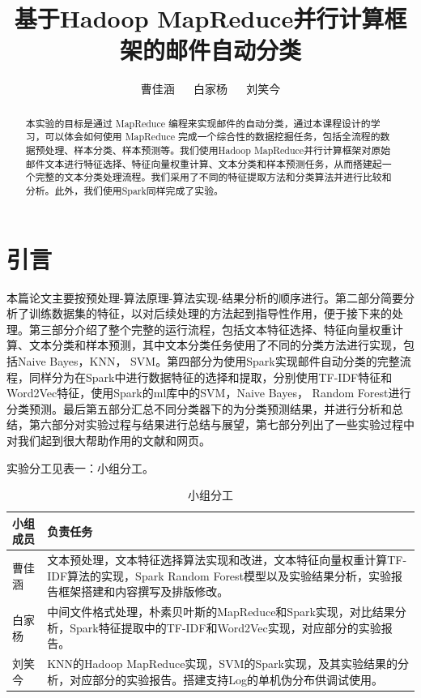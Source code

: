 \documentclass[lang=cn,11pt]{elegantpaper}
\title{基于Hadoop MapReduce并行计算框架的邮件自动分类}
\author{曹佳涵 $\quad$ 白家杨 $\quad$ 刘笑今}
\institute{2019st04小组}
\date{}
\begin{document}
\maketitle

\begin{abstract}
\noindent 本实验的目标是通过 MapReduce 编程来实现邮件的自动分类，通过本课程设计的学习，可以体会如何使用 MapReduce 完成一个综合性的数据挖掘任务，包括全流程的数据预处理、样本分类、样本预测等。我们使用Hadoop MapReduce并行计算框架对原始邮件文本进行特征选择、特征向量权重计算、文本分类和样本预测任务，从而搭建起一个完整的文本分类处理流程。我们采用了不同的特征提取方法和分类算法并进行比较和分析。此外，我们使用Spark同样完成了实验。
\end{abstract}

\tableofcontents

\section{引言}
本篇论文主要按预处理-算法原理-算法实现-结果分析的顺序进行。第二部分简要分析了训练数据集的特征，以对后续处理的方法起到指导性作用，便于接下来的处理。第三部分介绍了整个完整的运行流程，包括文本特征选择、特征向量权重计算、文本分类和样本预测，其中文本分类任务使用了不同的分类方法进行实现，包括Naive Bayes，KNN， SVM。第四部分为使用Spark实现邮件自动分类的完整流程，同样分为在Spark中进行数据特征的选择和提取，分别使用TF-IDF特征和Word2Vec特征，使用Spark的ml库中的SVM，Naive Bayes， Random Forest进行分类预测。最后第五部分汇总不同分类器下的为分类预测结果，并进行分析和总结，第六部分对实验过程与结果进行总结与展望，第七部分列出了一些实验过程中对我们起到很大帮助作用的文献和网页。

实验分工见表一：小组分工。
\begin{table}[H]
  \small
  \centering
  \caption{小组分工 \label{tab:reg}}
  \begin{tabular}{|p{2.5cm}|p{10cm}|}
    \toprule
    小组成员  &   负责任务  \\
    \hline
    曹佳涵 & 文本预处理，文本特征选择算法实现和改进，文本特征向量权重计算TF-IDF算法的实现，Spark Random Forest模型以及实验结果分析，实验报告框架搭建和内容撰写及排版修改。\\
    \hline
    白家杨 & 中间文件格式处理，朴素贝叶斯的MapReduce和Spark实现，对比结果分析，Spark特征提取中的TF-IDF和Word2Vec实现，对应部分的实验报告。 \\
    \hline
    刘笑今 & KNN的Hadoop MapReduce实现，SVM的Spark实现，及其实验结果的分析，对应部分的实验报告。搭建支持Log的单机伪分布供调试使用。 \\
    \bottomrule
    \end{tabular}%
\end{table}%
\end{document}
